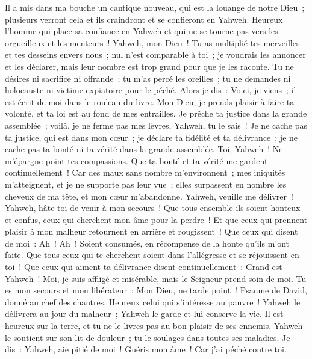 \begin{multicols}{2}
Il a mis dans ma bouche un cantique nouveau, qui est la louange de notre Dieu~; plusieurs verront cela et ils craindront et se confieront en Yahweh.
Heureux l'homme qui place sa confiance en Yahweh et qui ne se tourne pas vers les orgueilleux et les menteurs~!
Yahweh, mon Dieu~! Tu as multiplié tes merveilles et tes desseins envers nous~; nul n'est comparable à toi~; je voudrais les annoncer et les déclarer, mais leur nombre est trop grand pour que je les raconte.
Tu ne désires ni sacrifice ni offrande~; tu m'as percé les oreilles~; tu ne demandes ni holocauste ni victime expiatoire pour le péché.
Alors je dis~: Voici, je viens~; il est écrit de moi dans le rouleau du livre.
Mon Dieu, je prends plaisir à faire ta volonté, et ta loi est au fond de mes entrailles.
Je prêche ta justice dans la grande assemblée~; voilà, je ne ferme pas mes lèvres, Yahweh, tu le sais~!
Je ne cache pas ta justice, qui est dans mon cœur~; je déclare ta fidélité et ta délivrance~; je ne cache pas ta bonté ni ta vérité dans la grande assemblée.
Toi, Yahweh~! Ne m'épargne point tes compassions. Que ta bonté et ta vérité me gardent continuellement~!
Car des maux sans nombre m'environnent~; mes iniquités m'atteignent, et je ne supporte pas leur vue~; elles surpassent en nombre les cheveux de ma tête, et mon cœur m'abandonne.
Yahweh, veuille me délivrer~! Yahweh, hâte-toi de venir à mon secours~!
Que tous ensemble ils soient honteux et confus, ceux qui cherchent mon âme pour la perdre~! Et que ceux qui prennent plaisir à mon malheur retournent en arrière et rougissent~!
Que ceux qui disent de moi~: Ah~! Ah~! Soient consumés, en récompense de la honte qu'ils m'ont faite.
Que tous ceux qui te cherchent soient dans l'allégresse et se réjouissent en toi~! Que ceux qui aiment ta délivrance disent continuellement~: Grand est Yahweh~!
Moi, je suis affligé et misérable, mais le Seigneur prend soin de moi. Tu es mon secours et mon libérateur~: Mon Dieu, ne tarde point~!
\VerseOne{}Psaume de David, donné au chef des chantres.
Heureux celui qui s'intéresse au pauvre~! Yahweh le délivrera au jour du malheur~;
Yahweh le garde et lui conserve la vie. Il est heureux sur la terre, et tu ne le livres pas au bon plaisir de ses ennemis.
Yahweh le soutient sur son lit de douleur~; tu le soulages dans toutes ses maladies.
Je dis~: Yahweh, aie pitié de moi~! Guéris mon âme~! Car j'ai péché contre toi.

\end{multicols}
